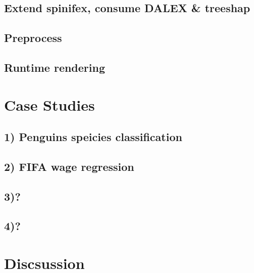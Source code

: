 \documentclass[
]{article}
\begin{document}
\hypertarget{extend-spinifex-consume-dalex-treeshap}{%
\subsection{Extend spinifex, consume DALEX \& treeshap}\label{extend-spinifex-consume-dalex-treeshap}}

\hypertarget{preprocess}{%
\subsection{Preprocess}\label{preprocess}}

\hypertarget{runtime-rendering}{%
\subsection{Runtime rendering}\label{runtime-rendering}}

\hypertarget{sec:casestudies}{%
\section{Case Studies}\label{sec:casestudies}}

\hypertarget{penguins-speicies-classification}{%
\subsection{1) Penguins speicies classification}\label{penguins-speicies-classification}}

\hypertarget{fifa-wage-regression}{%
\subsection{2) FIFA wage regression}\label{fifa-wage-regression}}

\hypertarget{section}{%
\subsection{3)?}\label{section}}

\hypertarget{section-1}{%
\subsection{4)?}\label{section-1}}

\hypertarget{discsussion}{%
\section{Discsussion}\label{discsussion}}
\end{document}
